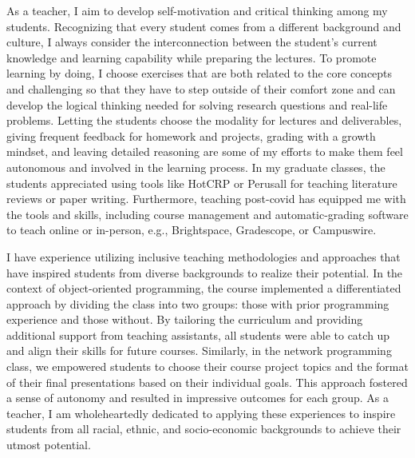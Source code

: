 \documentclass[10pt]{article}
\renewcommand*\paragraph[1]{}
\begin{document}
%
As a teacher, I aim to develop self-motivation and critical thinking among my students. Recognizing that every student comes from a different background and culture, I always consider the interconnection between the student's current knowledge and learning capability while preparing the lectures. To promote learning by doing, I choose exercises that are both related to the core concepts and challenging so that they have to step outside of their comfort zone and can develop the logical thinking needed for solving research questions and real-life problems. Letting the students choose the modality for lectures and deliverables, giving frequent feedback for homework and projects, grading with a growth mindset, and leaving detailed reasoning are some of my efforts to make them feel autonomous and involved in the learning process. \ifx\degreeLevel\undefined \else In my graduate classes, the students appreciated using tools like HotCRP or Perusall for teaching literature reviews or paper writing. \fi
Furthermore, teaching post-covid has equipped me with the tools and skills, including course management and automatic-grading
software to teach online or in-person, e.g., Brightspace, Gradescope, or Campuswire.


I have experience utilizing inclusive teaching methodologies and approaches that have inspired students from diverse backgrounds to realize their potential. In the context of object-oriented programming, the course implemented a differentiated approach by dividing the class into two groups: those with prior programming experience and those without. By tailoring the curriculum and providing additional support from teaching assistants, all students were able to catch up and align their skills for future courses. Similarly, in the network programming class, we empowered students to choose their course project topics and the format of their final presentations based on their individual goals. This approach fostered a sense of autonomy and resulted in impressive outcomes for each group. As a teacher, I am wholeheartedly dedicated to applying these experiences to inspire students from all racial, ethnic, and socio-economic backgrounds to achieve their utmost potential.
\end{document}
